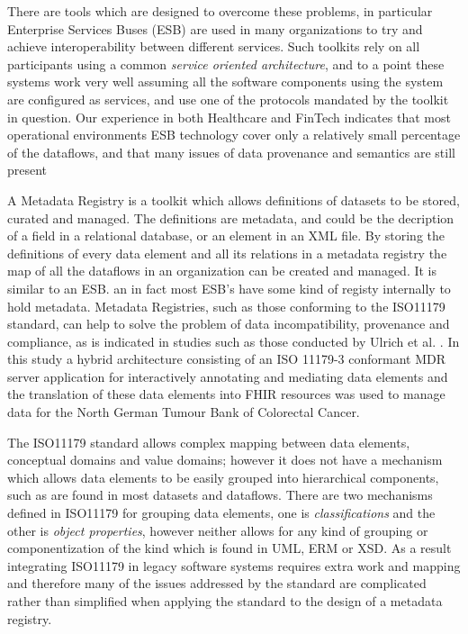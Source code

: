 \documentclass{llncs}
\begin{document}
There are tools which are designed to overcome these problems, in particular Enterprise Services Buses (ESB) are used in many organizations to try and achieve interoperability between different services. Such toolkits rely on all participants using a common \emph{service oriented architecture}, and to a point these systems work very well assuming all the software components using the system are configured as services, and use one of the protocols mandated by the toolkit in question.  Our experience in both Healthcare and FinTech indicates that most operational environments ESB technology cover only a relatively small percentage of the dataflows, and that many issues of data provenance and semantics are still present

A Metadata Registry is a toolkit which allows definitions of datasets to be stored, curated and managed. The definitions are metadata, and could be the decription of a field in a relational database, or an element in an XML file. By storing the definitions of every data element and all its relations in a metadata registry the map of all the dataflows in an organization can be created and managed. It is similar to an ESB. an in fact most ESB's have some kind of registy internally to hold metadata. Metadata Registries, such as those conforming to the ISO11179 standard, can help to solve the problem of data incompatibility, provenance and compliance, as is indicated in studies such as those conducted by Ulrich et al. \cite{MDRHL7} . In this study a hybrid architecture consisting of an ISO 11179-3 conformant MDR server application for interactively annotating and mediating data elements and the translation of these data elements into FHIR resources was used to manage data for the North German Tumour Bank of Colorectal Cancer. 

The ISO11179 standard allows complex mapping between data elements, conceptual domains and value domains; however it does not have a mechanism which allows data elements to be easily grouped into hierarchical components, such as are found in most datasets and dataflows. There are two mechanisms defined in ISO11179 for grouping data elements, one is \emph{classifications} and the other is \emph{object properties}, however neither allows for any kind of grouping or componentization of the kind which is found in UML, ERM or XSD. As a result integrating ISO11179 in legacy software systems requires extra work and mapping and therefore many of the issues addressed by the standard are complicated rather than simplified when applying the standard to the design of a metadata registry. 
\end{document}
